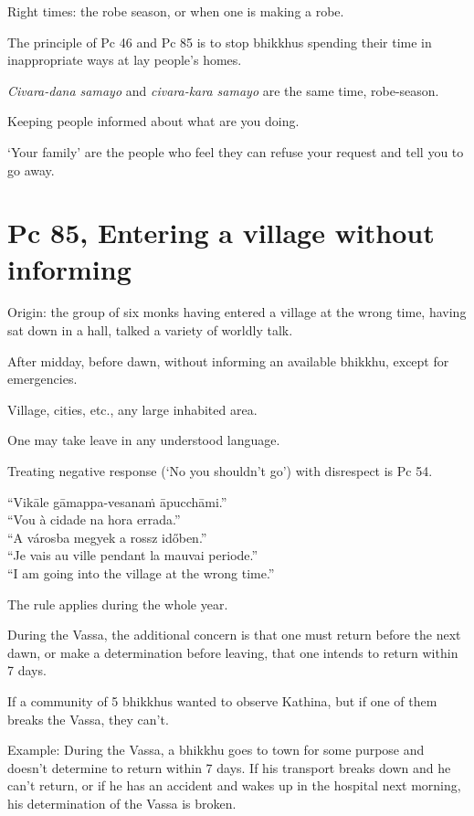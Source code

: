 Right times: the robe season, or when one is making a robe.

The principle of Pc 46 and Pc 85 is to stop bhikkhus spending their time
in inappropriate ways at lay people's homes.

\emph{Civara-dana samayo} and \emph{civara-kara samayo} are the same
time, robe-season.

Keeping people informed about what are you doing.

`Your family' are the people who feel they can refuse your request and
tell you to go away.

\section{Pc 85, Entering a village without informing}

\begin{multicols}{2}

Origin: the group of six monks having entered a village at the wrong
time, having sat down in a hall, talked a variety of worldly talk.

After midday, before dawn, without informing an available bhikkhu,
except for emergencies.

Village, cities, etc., any large inhabited area.

One may take leave in any understood language.

Treating negative response (`No you shouldn't go') with disrespect is Pc
54.

``Vikāle gāmappa-vesanaṁ āpucchāmi.''\\
``Vou à cidade na hora errada.''\\
``A városba megyek a rossz időben.''\\
``Je vais au ville pendant la mauvai periode.''\\
``I am going into the village at the wrong time.''

The rule applies during the whole year.

During the Vassa, the additional concern is that one must return before
the next dawn, or make a determination before leaving, that one intends
to return within 7 days.

If a community of 5 bhikkhus wanted to observe Kathina, but if one of
them breaks the Vassa, they can't.

Example: During the Vassa, a bhikkhu goes to town for some purpose and
doesn't determine to return within 7 days. If his transport breaks down
and he can't return, or if he has an accident and wakes up in the
hospital next morning, his determination of the Vassa is broken.

\end{multicols}

